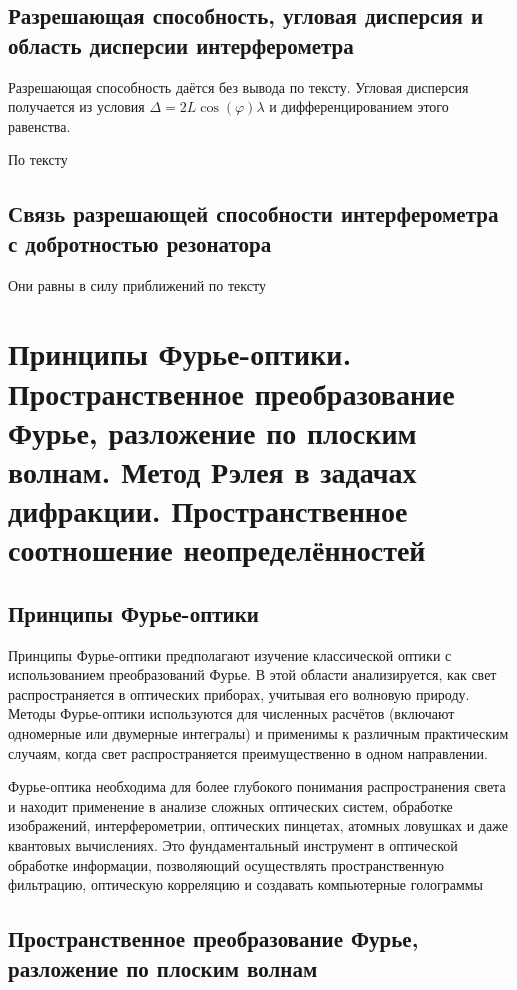 \documentclass[a4paper, 14pt]{article}
\begin{document}
    \subsection{Разрешающая способность, угловая дисперсия и область дисперсии интерферометра}
    
    Разрешающая способность даётся без вывода по тексту.
    Угловая дисперсия получается из условия $\Delta = 2L \cos(\varphi) \lambda$ и дифференцированием этого равенства.
    
    По тексту
    
    \subsection{Связь разрешающей способности интерферометра с добротностью резонатора}
    
    Они равны в силу приближений по тексту
    
    \section{Принципы Фурье-оптики.
    Пространственное преобразование Фурье, разложение по плоским волнам.
    Метод Рэлея в задачах дифракции.
    Пространственное соотношение неопределённостей}
    
    \subsection{Принципы Фурье-оптики}
    
    Принципы Фурье-оптики предполагают изучение классической оптики с использованием преобразований Фурье.
    В этой области анализируется, как свет распространяется в оптических приборах, учитывая его волновую природу.
    Методы Фурье-оптики используются для численных расчётов (включают одномерные или двумерные интегралы) и
    применимы к различным практическим случаям, когда свет
    распространяется преимущественно в одном направлении.
    
    Фурье-оптика необходима для более глубокого понимания распространения света и находит применение в
    анализе сложных оптических систем, обработке изображений, интерферометрии, оптических пинцетах, атомных ловушках
    и даже квантовых вычислениях.
    Это фундаментальный инструмент в оптической обработке информации, позволяющий осуществлять пространственную
    фильтрацию, оптическую корреляцию и создавать компьютерные голограммы
    
    \subsection{Пространственное преобразование Фурье, разложение по плоским волнам}
    
\end{document}
